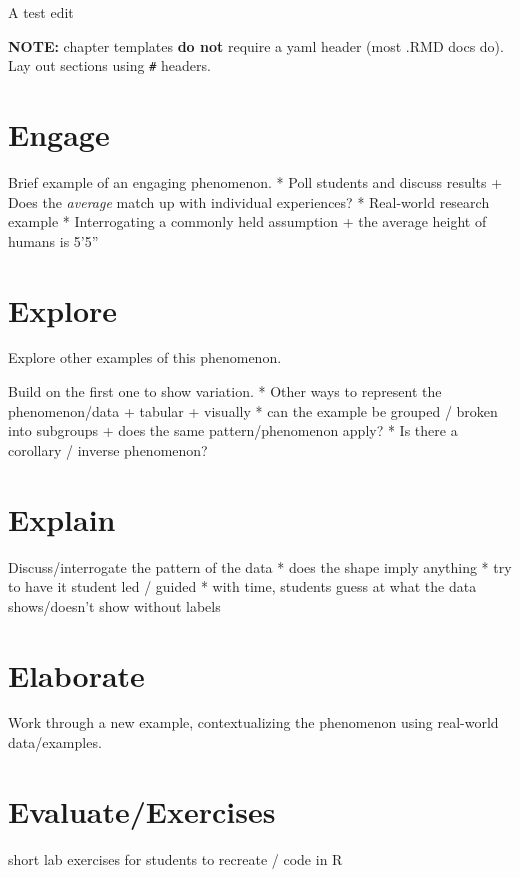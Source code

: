 \documentclass[
]{book}
\begin{document}
A test edit

\textbf{NOTE:} chapter templates \textbf{do not} require a yaml header (most .RMD docs do). Lay out sections using \texttt{\#} headers.

\hypertarget{engage}{%
\chapter{Engage}\label{engage}}

Brief example of an engaging phenomenon.
* Poll students and discuss results
+ Does the \emph{average} match up with individual experiences?
* Real-world research example
* Interrogating a commonly held assumption
+ the average height of humans is 5'5''

\hypertarget{explore}{%
\chapter{Explore}\label{explore}}

Explore other examples of this phenomenon.

Build on the first one to show variation.
* Other ways to represent the phenomenon/data
+ tabular
+ visually
* can the example be grouped / broken into subgroups
+ does the same pattern/phenomenon apply?
* Is there a corollary / inverse phenomenon?

\hypertarget{explain}{%
\chapter{Explain}\label{explain}}

Discuss/interrogate the pattern of the data
* does the shape imply anything
* try to have it student led / guided
* with time, students guess at what the data shows/doesn't show without labels

\hypertarget{elaborate}{%
\chapter{Elaborate}\label{elaborate}}

Work through a new example, contextualizing the phenomenon using real-world data/examples.

\hypertarget{evaluateexercises}{%
\chapter{Evaluate/Exercises}\label{evaluateexercises}}

short lab exercises for students to recreate / code in R
\end{document}
